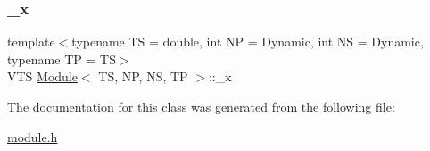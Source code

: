 \subsubsection{\texorpdfstring{\+\_\+x}{\_x}}
{\footnotesize\ttfamily template$<$typename TS = double, int NP = Dynamic, int NS = Dynamic, typename TP = TS$>$ \\
V\+TS \mbox{\hyperlink{class_module}{Module}}$<$ TS, NP, NS, TP $>$\+::\+\_\+x\hspace{0.3cm}{\ttfamily [protected]}}



The documentation for this class was generated from the following file\+:\begin{DoxyCompactItemize}
\item 
\mbox{\hyperlink{module_8h}{module.\+h}}\end{DoxyCompactItemize}
